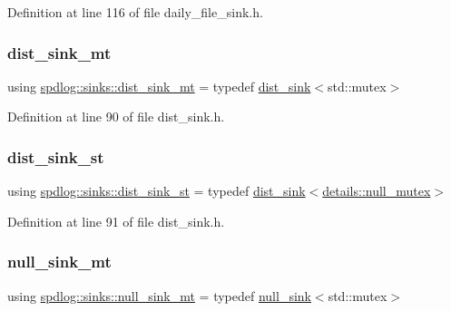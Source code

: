 Definition at line 116 of file daily\+\_\+file\+\_\+sink.\+h.

\mbox{\label{namespacespdlog_1_1sinks_a1ec468592fd56492075c61a4917acd12}} 
\subsubsection{\texorpdfstring{dist\+\_\+sink\+\_\+mt}{dist\_sink\_mt}}
{\footnotesize\ttfamily using \hyperlink{namespacespdlog_1_1sinks_a1ec468592fd56492075c61a4917acd12}{spdlog\+::sinks\+::dist\+\_\+sink\+\_\+mt} = typedef \hyperlink{classspdlog_1_1sinks_1_1dist__sink}{dist\+\_\+sink}$<$std\+::mutex$>$}



Definition at line 90 of file dist\+\_\+sink.\+h.

\mbox{\label{namespacespdlog_1_1sinks_a08b36045f24c178daafc48778df0ce5a}} 
\subsubsection{\texorpdfstring{dist\+\_\+sink\+\_\+st}{dist\_sink\_st}}
{\footnotesize\ttfamily using \hyperlink{namespacespdlog_1_1sinks_a08b36045f24c178daafc48778df0ce5a}{spdlog\+::sinks\+::dist\+\_\+sink\+\_\+st} = typedef \hyperlink{classspdlog_1_1sinks_1_1dist__sink}{dist\+\_\+sink}$<$\hyperlink{structspdlog_1_1details_1_1null__mutex}{details\+::null\+\_\+mutex}$>$}



Definition at line 91 of file dist\+\_\+sink.\+h.

\mbox{\label{namespacespdlog_1_1sinks_a0712014c0dae16e0b332d3caba31435a}} 
\subsubsection{\texorpdfstring{null\+\_\+sink\+\_\+mt}{null\_sink\_mt}}
{\footnotesize\ttfamily using \hyperlink{namespacespdlog_1_1sinks_a0712014c0dae16e0b332d3caba31435a}{spdlog\+::sinks\+::null\+\_\+sink\+\_\+mt} = typedef \hyperlink{classspdlog_1_1sinks_1_1null__sink}{null\+\_\+sink}$<$std\+::mutex$>$}



